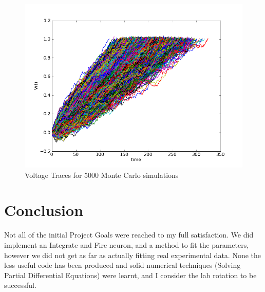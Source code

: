 \documentclass[10pt]{article}
\begin{document}
\begin{figure}[htp]
\centering
\includegraphics[scale=0.60]{traces.png}
\caption{Voltage Traces for 5000 Monte Carlo simulations }
\label{traces}
\end{figure}

\section{Conclusion}

Not all of the initial Project Goals were reached to my full
satisfaction. We did implement an Integrate and Fire
neuron, and a method to fit the parameters, however we did not get as
far as actually fitting real experimental data. None the less 
useful code has been produced and solid numerical techniques (Solving
Partial Differential Equations) were
learnt, and I consider the lab rotation to be successful. 

{  }
\end{document}
